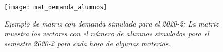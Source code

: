\begin{figure}[H]
\centering
\texttt{[image: mat\_demanda\_alumnos]} %
\caption[\textit{Ejemplo de matriz con demanda simulada para el 2020-2}]{\textit{Ejemplo de matriz con demanda simulada para el 2020-2: La matriz muestra los vectores con el número de alumnos simulados para el semestre 2020-2 para cada hora de algunas materias.}}\label{matDemandaAlum}
\end{figure}
